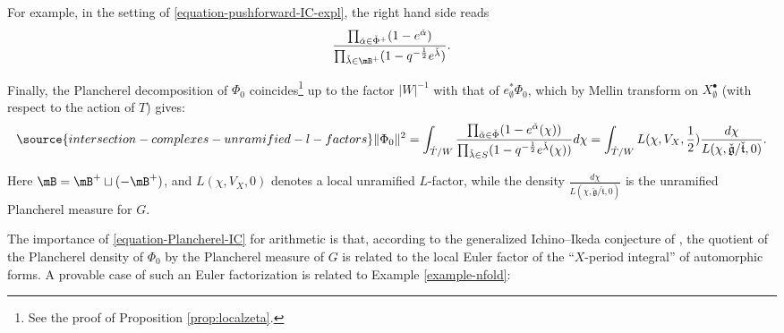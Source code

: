 For example, in the setting of  \eqref{equation-pushforward-IC-expl}, the right hand side reads
\[\frac{\prod_{\check\alpha\in\check\Phi^+} (1- e^{\check\alpha})}{\prod_{\check\lambda \in \mB^+} (1-q^{-\frac{1}{2}} e^{\check\lambda})}.\]



Finally, the Plancherel decomposition of $\Phi_0$ coincides\footnote{See the proof of Proposition \ref{prop:localzeta}.} up to the factor $|W|^{-1}$ with that of $e_\emptyset^*\Phi_0$, which by Mellin transform on $X_\emptyset^\bullet$ (with respect to the action of $T$) gives:
\begin{equation}
 \label{equation-Plancherel-IC}
\source{intersection-complexes-unramified-l-factors}
\Vert \Phi_0\Vert^2 = \int_{\hat T/W} \frac{\prod_{\check\alpha\in\check\Phi} (1- e^{\check\alpha}(\chi))}{\prod_{\check\lambda\in S} (1-q^{-\frac{1}{2}} e^{\check\lambda}(\chi))} d\chi = \int_{\hat T/W} L(\chi, V_X, \frac{1}{2}) \frac{d\chi}{L(\chi, \check{\mathfrak g}/\check{\mathfrak t},0)}.
\end{equation}

Here $\mB = \mB^+ \sqcup (-\mB^+)$, and  $L(\chi, V_X, 0)$ denotes a local unramified $L$-factor, while the density $\frac{d\chi}{L(\chi, \check{\mathfrak g}/\check{\mathfrak t},0)}$ is the unramified Plancherel measure for $G$.

The importance of \eqref{equation-Plancherel-IC} for arithmetic is that, according to the generalized Ichino--Ikeda conjecture of \cite{SV}, the quotient of the Plancherel density of $\Phi_0$ by the Plancherel measure of $G$ is related to the local Euler factor of the ``$X$-period integral'' of automorphic forms. A provable case of such an Euler factorization is related to Example \ref{example-nfold}:

